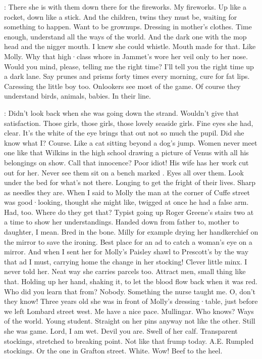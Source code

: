 \Bloom:
There she is with them down there for the fireworks.
My fireworks.
Up like a rocket,
down like a stick.
And the children,
twins they must be,
waiting for something to happen.
Want to be grownups.
Dressing in
mother's clothes.
Time enough,
understand all the ways of the world.
And
the dark one with the mop head and the nigger mouth.
I knew she could
whistle.
Mouth made for that.
Like Molly.
Why that high·class whore in
Jammet's wore her veil only to her nose.
Would you mind,
please,
telling
me the right time?
I'll tell you the right time up a dark lane.
Say prunes
and prisms forty times every morning,
cure for fat lips.
Caressing the
little boy too.
Onlookers see most of the game.
Of course they understand
birds,
animals,
babies.
In their line.

\Bloom:
Didn't look back when she was going down the strand.
Wouldn't give that
satisfaction.
Those girls,
those girls,
those lovely seaside girls.
Fine
eyes she had,
clear.
It's the white of the eye brings that out not so much
the pupil.
Did she know what I?
Course.
Like a cat sitting beyond a dog's
jump.
Women never meet one like that Wilkins in the high school drawing a
picture of Venus with all his belongings on show.
Call that innocence?
Poor idiot!
His wife has her work cut out for her.
Never see them sit
on a bench marked .
Eyes all over them.
Look under the bed
for what's not there.
Longing to get the fright of their lives.
Sharp as needles they are.
When I said to Molly the man at the corner
of Cuffe street was good·looking,
thought she might like,
twigged at
once he had a false arm.
Had,
too.
Where do they get that?
Typist
going up Roger Greene's stairs two at a time to show her understandings.
Handed down from father to,
mother to daughter,
I mean.
Bred in the
bone.
Milly for example
drying her handkerchief on the mirror
to save the ironing.
Best place for an ad to catch a woman's eye on a mirror.
And when I sent her for Molly's Paisley shawl to Prescott's
by the way that ad I must,
carrying home the change in her stocking!
Clever little minx.
I never told her.
Neat way she carries parcels
too.
Attract men,
small thing like that.
Holding up her hand,
shaking it,
to let the blood flow back when it was red.
Who did you learn that from?
Nobody.
Something the nurse taught me.
O,
don't they know!
Three years
old she was in front of Molly's dressing·table,
just before we left Lombard
street west.
Me have a nice pace.
Mullingar.
Who knows?
Ways of the
world.
Young student.
Straight on her pins anyway not like the other.
Still she was game.
Lord,
I am wet.
Devil you are.
Swell of her calf.
Transparent stockings,
stretched to breaking point.
Not like that frump today.
A.E.
Rumpled stockings.
Or the one in Grafton street.
White.
Wow!
Beef to the heel.

